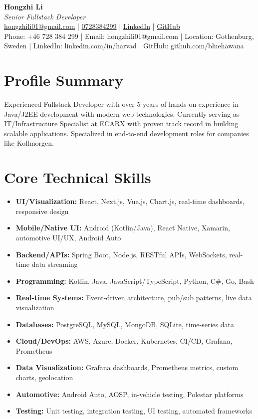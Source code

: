 \documentclass[11pt,a4paper]{article}
\begin{document}
\pagestyle{empty} %

\begin{center}
{\LARGE \textbf{Hongzhi Li}}\\[10pt]
{\Large \textit{Senior Fullstack Developer}}\\[10pt]
\textcolor{linkedinblue}{\href{mailto:hongzhili01@gmail.com}{hongzhili01@gmail.com} | \href{tel:0728384299}{0728384299} | \href{https://www.linkedin.com/in/harvad/}{LinkedIn} | \href{https://github.com/bluehawana}{GitHub}}
\\[6pt]
Phone: +46 728 384 299 | Email: hongzhili01@gmail.com | Location: Gothenburg, Sweden | LinkedIn: linkedin.com/in/harvad | GitHub: github.com/bluehawana
\end{center}

\section*{Profile Summary}
Experienced Fullstack Developer with over 5 years of hands-on experience in Java/J2EE development with modern web technologies. Currently serving as IT/Infrastructure Specialist at ECARX with proven track record in building scalable applications. Specialized in end-to-end development roles for companies like Kollmorgen.

\section*{Core Technical Skills}
\begin{itemize}[noitemsep]
\item \textbf{UI/Visualization:} React, Next.js, Vue.js, Chart.js, real-time dashboards, responsive design
\item \textbf{Mobile/Native UI:} Android (Kotlin/Java), React Native, Xamarin, automotive UI/UX, Android Auto
\item \textbf{Backend/APIs:} Spring Boot, Node.js, RESTful APIs, WebSockets, real-time data streaming
\item \textbf{Programming:} Kotlin, Java, JavaScript/TypeScript, Python, C\#, Go, Bash
\item \textbf{Real-time Systems:} Event-driven architecture, pub/sub patterns, live data visualization
\item \textbf{Databases:} PostgreSQL, MySQL, MongoDB, SQLite, time-series data
\item \textbf{Cloud/DevOps:} AWS, Azure, Docker, Kubernetes, CI/CD, Grafana, Prometheus
\item \textbf{Data Visualization:} Grafana dashboards, Prometheus metrics, custom charts, geolocation
\item \textbf{Automotive:} Android Auto, AOSP, in-vehicle testing, Polestar platforms
\item \textbf{Testing:} Unit testing, integration testing, UI testing, automated frameworks
\end{itemize}
\end{document}
